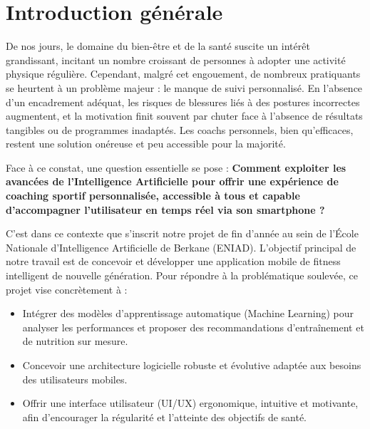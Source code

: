 \chapter*{Introduction générale}

De nos jours, le domaine du bien-être et de la santé suscite un intérêt grandissant, incitant un nombre croissant de personnes à adopter une activité physique régulière. Cependant, malgré cet engouement, de nombreux pratiquants se heurtent à un problème majeur : le manque de suivi personnalisé. En l'absence d'un encadrement adéquat, les risques de blessures liés à des postures incorrectes augmentent, et la motivation finit souvent par chuter face à l'absence de résultats tangibles ou de programmes inadaptés. Les coachs personnels, bien qu'efficaces, restent une solution onéreuse et peu accessible pour la majorité.

Face à ce constat, une question essentielle se pose : \textbf{Comment exploiter les avancées de l'Intelligence Artificielle pour offrir une expérience de coaching sportif personnalisée, accessible à tous et capable d'accompagner l'utilisateur en temps réel via son smartphone ?}

C'est dans ce contexte que s'inscrit notre projet de fin d'année au sein de l'École Nationale d'Intelligence Artificielle de Berkane (ENIAD). L'objectif principal de notre travail est de concevoir et développer une application mobile de fitness intelligent de nouvelle génération. Pour répondre à la problématique soulevée, ce projet vise concrètement à :
\begin{itemize}
    \item Intégrer des modèles d'apprentissage automatique (Machine Learning) pour analyser les performances et proposer des recommandations d'entraînement et de nutrition sur mesure.
    \item Concevoir une architecture logicielle robuste et évolutive adaptée aux besoins des utilisateurs mobiles.
    \item Offrir une interface utilisateur (UI/UX) ergonomique, intuitive et motivante, afin d'encourager la régularité et l'atteinte des objectifs de santé.
\end{itemize}

